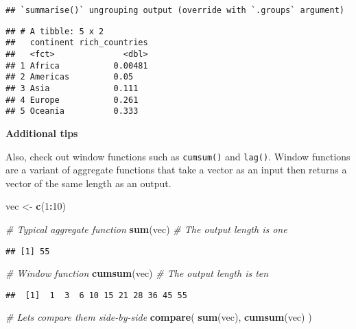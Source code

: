 \documentclass[
]{book}
\newenvironment{Shaded}{\begin{snugshade}}{\end{snugshade}}
\newcommand{\CommentTok}[1]{\textcolor[rgb]{0.56,0.35,0.01}{\textit{#1}}}
\newcommand{\DecValTok}[1]{\textcolor[rgb]{0.00,0.00,0.81}{#1}}
\newcommand{\KeywordTok}[1]{\textcolor[rgb]{0.13,0.29,0.53}{\textbf{#1}}}
\newcommand{\NormalTok}[1]{#1}
\newcommand{\OperatorTok}[1]{\textcolor[rgb]{0.81,0.36,0.00}{\textbf{#1}}}
\newcommand{\StringTok}[1]{\textcolor[rgb]{0.31,0.60,0.02}{#1}}
\begin{document}
\begin{verbatim}
## `summarise()` ungrouping output (override with `.groups` argument)
\end{verbatim}

\begin{verbatim}
## # A tibble: 5 x 2
##   continent rich_countries
##   <fct>              <dbl>
## 1 Africa           0.00481
## 2 Americas         0.05   
## 3 Asia             0.111  
## 4 Europe           0.261  
## 5 Oceania          0.333
\end{verbatim}

\textbf{Additional tips}

Also, check out window functions such as \texttt{cumsum()} and \texttt{lag()}. Window functions are a variant of aggregate functions that take a vector as an input then returns a vector of the same length as an output.

\begin{Shaded}
\begin{Highlighting}[]
\NormalTok{vec \textless{}{-}}\StringTok{ }\KeywordTok{c}\NormalTok{(}\DecValTok{1}\OperatorTok{:}\DecValTok{10}\NormalTok{)}

\CommentTok{\# Typical aggregate function}
\KeywordTok{sum}\NormalTok{(vec) }\CommentTok{\# The output length is one}
\end{Highlighting}
\end{Shaded}

\begin{verbatim}
## [1] 55
\end{verbatim}

\begin{Shaded}
\begin{Highlighting}[]
\CommentTok{\# Window function}
\KeywordTok{cumsum}\NormalTok{(vec) }\CommentTok{\# The output length is ten}
\end{Highlighting}
\end{Shaded}

\begin{verbatim}
##  [1]  1  3  6 10 15 21 28 36 45 55
\end{verbatim}

\begin{Shaded}
\begin{Highlighting}[]
\CommentTok{\# Let\textquotesingle{}s compare them side{-}by{-}side}
\KeywordTok{compare}\NormalTok{(}
  \KeywordTok{sum}\NormalTok{(vec),}
  \KeywordTok{cumsum}\NormalTok{(vec)}
\NormalTok{)}
\end{Highlighting}
\end{Shaded}
\end{document}
